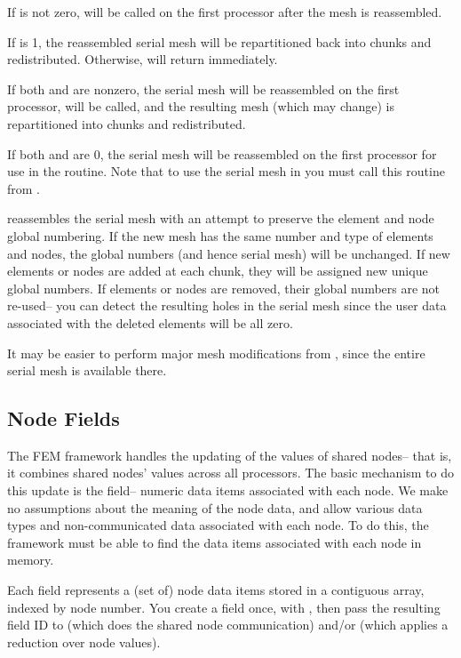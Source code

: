 \documentclass[10pt]{article}
\begin{document}
     If  is not zero, 
will be called on the first processor after the mesh is reassembled.

     If  is 1, the reassembled serial mesh will be
repartitioned back into chunks and redistributed.  Otherwise,
 will return immediately.

     If both  and  are nonzero, the
serial mesh will be reassembled on the first processor,  will
be called, and the resulting mesh (which  may change) is
repartitioned into chunks and redistributed.

     If both  and  are 0, the serial mesh
will be reassembled on the first processor for use in the 
routine.  Note that to use the serial mesh in  you must call
this routine from .

      reassembles the serial mesh with an attempt to
     preserve the element and node global numbering.  If the new mesh
     has the same number and type of elements and nodes, the global
     numbers (and hence serial mesh) will be unchanged.  If new
     elements or nodes are added at each chunk, they will be assigned
     new unique global numbers.  If elements or nodes are removed,
     their global numbers are not re-used-- you can detect the
     resulting holes in the serial mesh since the user data associated
     with the deleted elements will be all zero.

     It may be easier to perform major mesh modifications from
     , since the entire serial mesh is available there.

\subsection{Node Fields}

The FEM framework handles the updating of the values of shared nodes-- that
is, it combines shared nodes' values across all processors.  The basic
mechanism to do this update is the field-- numeric data items associated
with each node. We make no assumptions about the meaning of the node data,
and allow various data types and non-communicated data associated with each
node.  To do this, the framework must be able to find the data items
associated with each node in memory.

Each field represents a (set of) node data items stored in a contiguous array,
indexed by node number.  You create a field once, with ,
then pass the resulting field ID to  (which does the
shared node communication) and/or  (which applies a
reduction over node values).
\end{document}
